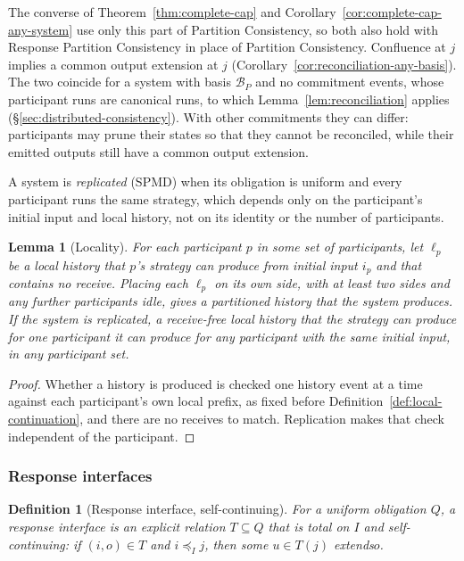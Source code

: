 \documentclass[sigconf]{cidr-2027}
\newtheorem{lemma}{Lemma}
\newtheorem{definition}{Definition}
\theoremstyle{remark}
\newcommand{\InputOrd}{\preceq_I}
\newcommand{\commitment}{commitment\xspace}
\newcommand{\commitments}{commitments\xspace}
\newcommand{\outrel}{extends\xspace}          %
\newcommand{\outnoun}{output extension\xspace}%
\begin{document}
The converse of Theorem~\ref{thm:complete-cap} and
Corollary~\ref{cor:complete-cap-any-system} use only this part of Partition
Consistency, so both also hold with Response Partition Consistency in place of
Partition Consistency. Confluence at $j$ implies a common \outnoun at $j$
(Corollary~\ref{cor:reconciliation-any-basis}). The two coincide for a system
with basis $\mathcal B_P$ and no \commitment events, whose participant runs
are canonical runs, to which Lemma~\ref{lem:reconciliation} applies
(\S\ref{sec:distributed-consistency}). With other \commitments they can
differ: participants may prune their states so that they cannot be
reconciled, while their emitted outputs still have a common \outnoun.

A system is \emph{replicated} (SPMD) when its obligation is uniform and every
participant runs the same strategy, which depends only on the participant's
initial input and local history, not on its identity or the number of
participants.

\begin{lemma}[Locality]
\label{lem:locality}
For each participant $p$ in some set of participants, let $\ell_p$ be a local
history that $p$'s
strategy can produce from initial input $i_p$ and that contains no receive. Placing each $\ell_p$ on its own side, with at least two sides and
any further participants
idle, gives a partitioned history that the system produces. If the system is
replicated, a receive-free local history that the strategy can produce for one participant
it can produce for any participant with the same initial input, in any
participant set.
\end{lemma}

\begin{proof}
Whether a history is produced is checked one history event at a time against each
participant's own local prefix, as fixed before
Definition~\ref{def:local-continuation},
and there are no receives to match. Replication makes that check independent of the participant.
\end{proof}

\subsubsection{Response interfaces}

\begin{definition}[Response interface, self-continuing]
\label{def:response-interface}
For a uniform obligation $Q$, a \emph{response interface} is an explicit
relation $T\subseteq Q$ that is total on $I$ and \emph{self-continuing}: if
$(i,o)\in T$ and $i\InputOrd j$, then some $u\in T(j)$ \outrel $o$.
\end{definition}
\end{document}
